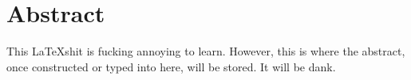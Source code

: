 \chapter{Abstract}
	This \LaTeX shit is fucking annoying to learn. However, this is where the abstract, once constructed or typed into here, will be stored. It will be dank.